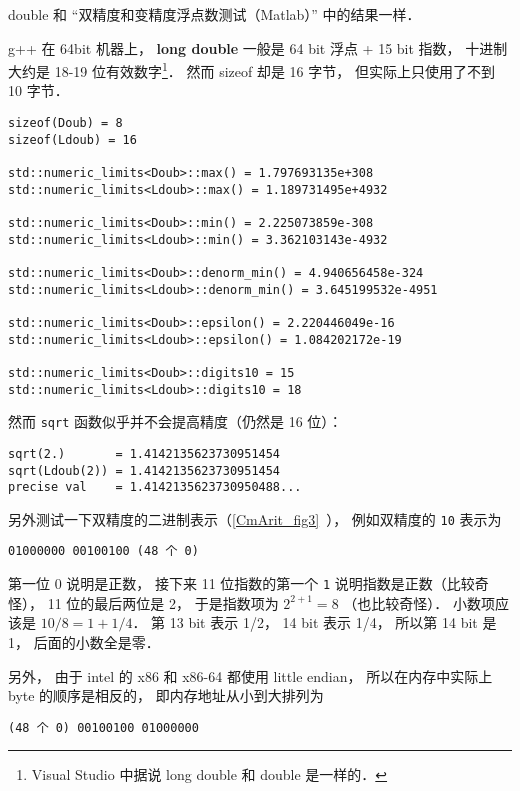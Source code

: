 
\begin{issues}
\issueDraft
\end{issues}


double 和 “双精度和变精度浮点数测试（Matlab）” 中的结果一样．

g++ 在 64bit 机器上， \textbf{long double} 一般是 64 bit 浮点 + 15 bit 指数， 十进制大约是 18-19 位有效数字\footnote{Visual Studio 中据说 long double 和 double 是一样的．}． 然而 sizeof 却是 16 字节， 但实际上只使用了不到 10 字节．

\begin{lstlisting}
sizeof(Doub) = 8
sizeof(Ldoub) = 16

std::numeric_limits<Doub>::max() = 1.797693135e+308
std::numeric_limits<Ldoub>::max() = 1.189731495e+4932

std::numeric_limits<Doub>::min() = 2.225073859e-308
std::numeric_limits<Ldoub>::min() = 3.362103143e-4932

std::numeric_limits<Doub>::denorm_min() = 4.940656458e-324
std::numeric_limits<Ldoub>::denorm_min() = 3.645199532e-4951

std::numeric_limits<Doub>::epsilon() = 2.220446049e-16
std::numeric_limits<Ldoub>::epsilon() = 1.084202172e-19

std::numeric_limits<Doub>::digits10 = 15
std::numeric_limits<Ldoub>::digits10 = 18
\end{lstlisting}

然而 \verb|sqrt| 函数似乎并不会提高精度（仍然是 16 位）：
\begin{lstlisting}
sqrt(2.)       = 1.4142135623730951454
sqrt(Ldoub(2)) = 1.4142135623730951454
precise val    = 1.4142135623730950488...
\end{lstlisting}

另外测试一下双精度的二进制表示（\autoref{CmArit_fig3}~）， 例如双精度的 \verb|10| 表示为
\begin{lstlisting}
01000000 00100100 (48 个 0)
\end{lstlisting}
第一位 0 说明是正数， 接下来 11 位指数的第一个 \verb|1| 说明指数是正数（比较奇怪）， 11 位的最后两位是 2， 于是指数项为 $2^{2+1} = 8$ （也比较奇怪）． 小数项应该是 $10/8 = 1+1/4$． 第 13 bit 表示 1/2， 14 bit 表示 1/4， 所以第 14 bit 是 1， 后面的小数全是零． 

另外， 由于 intel 的 x86 和 x86-64 都使用 little endian， 所以在内存中实际上 byte 的顺序是相反的， 即内存地址从小到大排列为
\begin{lstlisting}
(48 个 0) 00100100 01000000
\end{lstlisting}


